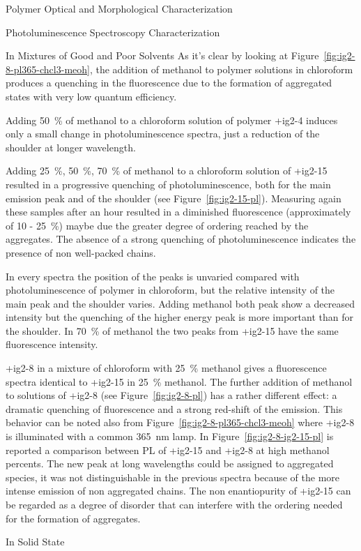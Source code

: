 \begin{section}{Polymer Optical and Morphological Characterization}
\begin{subsection}{Photoluminescence Spectroscopy Characterization}
\begin{subsubsection}{In Mixtures of Good and Poor Solvents}
As it's clear by looking at Figure~\ref{fig:ig2-8-pl365-chcl3-meoh}, the addition of methanol to polymer solutions in chloroform produces a quenching in the fluorescence due to the formation of aggregated states with very low quantum efficiency.

Adding 50~\% of methanol to a chloroform solution of polymer \cmpd+{ig2-4} induces only a small change in photoluminescence spectra, just a reduction of the shoulder at longer wavelength.

Adding 25~\%, 50~\%, 70~\% of methanol to a chloroform solution of \cmpd+{ig2-15} resulted in a progressive quenching of photoluminescence, both for the main emission peak and of the shoulder (see Figure~\ref{fig:ig2-15-pl}). 
Measuring again these samples after an hour resulted in a diminished fluorescence (approximately of 10 - 25~\%) maybe due the greater degree of ordering reached by the aggregates. The absence of a strong quenching of photoluminescence indicates the presence of non well-packed chains.

In every spectra the position of the peaks is unvaried compared with photoluminescence of polymer in chloroform, but the relative intensity of the main peak and the shoulder varies. Adding methanol both peak show a decreased intensity but the quenching of the higher energy peak is more important than for the shoulder. In 70~\% of methanol the two peaks from \cmpd+{ig2-15} have the same fluorescence intensity. 

\cmpd+{ig2-8} in a mixture of chloroform with 25~\% methanol gives a fluorescence spectra identical to \cmpd+{ig2-15} in 25~\% methanol. The further addition of methanol to solutions of \cmpd+{ig2-8} (see Figure~\ref{fig:ig2-8-pl}) has a rather different effect: a dramatic quenching of fluorescence and a strong red-shift of the emission. 
This behavior can be noted also from Figure~\ref{fig:ig2-8-pl365-chcl3-meoh} where \cmpd+{ig2-8} is illuminated with a common \SI{365}{\nm} lamp. In Figure~\ref{fig:ig2-8-ig2-15-pl} is reported a comparison between \gls{PL} of \cmpd+{ig2-15} and \cmpd+{ig2-8} at high methanol percents. The new peak at long wavelengths could be assigned to aggregated species, it was not distinguishable in the previous spectra because of the more intense emission of non aggregated chains. 
The non enantio\-purity of \cmpd+{ig2-15} can be regarded as a degree of disorder that can interfere with the ordering needed for the formation of aggregates.

\end{subsubsection}
\begin{subsubsection}{In Solid State}


\end{subsubsection}
\end{subsection}
\end{section}
